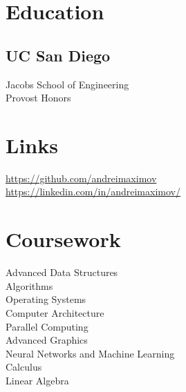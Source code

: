 \documentclass[]{resume}
\begin{document}
%
%
\lastupdated

%
%



%
%

\begin{minipage}[t]{0.33\textwidth}


\section{Education}

\subsection{UC San Diego}
Jacobs School of Engineering \\
Provost Honors \\
\sectionsep


\section{Links}
\href{https://github.com/andreimaximov}{https://github.com/andreimaximov} \\
\href{https://linkedin.com/in/andreimaximov/}{https://linkedin.com/in/andreimaximov/} \\
\sectionsep


\section{Coursework}

Advanced Data Structures \\
Algorithms \\
Operating Systems \\
Computer Architecture \\
Parallel Computing \\
Advanced Graphics \\
Neural Networks and Machine Learning \\
Calculus \\
Linear Algebra


\end{minipage}
\end{document}
